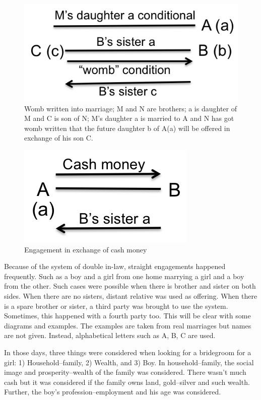 \begin{figure}
\center
\includegraphics{figures/engagement/womb_7}
\caption{Womb written into marriage; M and N are brothers; a is daughter of M and C is son of N; M's daughter a is married to A and N has got womb written that the future daughter b of A(a) will be offered in exchange of his son C.
\label{figure:engage_7}}
\end{figure}

\begin{figure}
\center
\includegraphics{figures/engagement/cash_8}
\caption{Engagement in exchange of cash money
\label{figure:engage_8}}
\end{figure}

Because of the system of double in-law, straight engagements happened
frequently. Such as a boy and a girl from one home marrying a girl and a boy
from the other. Such cases were possible when there is brother and sister on
both sides. When there are no sisters, distant relative was used as offering.
When there is a spare brother or sister, a third party was brought to use the
system. Sometimes, this happened with a fourth party too. This will be clear
with some diagrams and examples. The examples are taken from real marriages but
names are not given. Instead, alphabetical letters such as A, B, C are used.

In those days, three things were considered when looking for a bridegroom for a
girl: 1) Household--family, 2) Wealth, and 3) Boy. In household--family, the
social image and prosperity--wealth of the family was considered. There wasn't
much cash but it was considered if the family owns land, gold--silver and such
wealth. Further, the boy's profession--employment and his age was considered.

